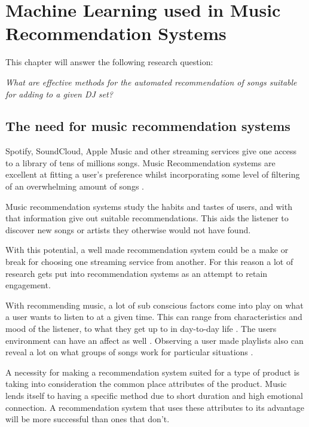 
\graphicspath{{Chapter2/}}

\chapter{Machine Learning used in Music Recommendation Systems}

This chapter will answer the following research question:

\textit{What are effective methods for the automated recommendation of songs suitable for adding to a given DJ set?} 

\section{The need for music recommendation systems}
Spotify, SoundCloud, Apple Music and other streaming services give one access to a library of tens of millions songs. Music Recommendation systems are excellent at fitting a user's preference whilst incorporating some level of filtering of an overwhelming amount of songs \citep{bollen_understanding_2010}. 

Music recommendation systems study the habits and tastes of users, and with that information give out suitable recommendations. This aids the listener to discover new songs or artists they otherwise would not have found.

With this potential, a well made recommendation system could be a make or break for choosing one streaming service from another. For this reason a lot of research gets put into recommendation systems as an attempt to retain engagement. 

 With recommending music, a lot of sub conscious factors come into play on what a user wants to listen to at a given time. This can range from characteristics and mood of the listener, to what they get up to in day-to-day life \citep{ferwerda_personality_2015, rentfrow_re_2003, gillhofer_iron_2015, wang_context-aware_2012}.  The users environment can have an affect as well \citep{kaminskas_location-aware_2013}. Observing a user made playlists also can reveal a lot on what groups of songs work for particular situations \citep{zheleva_statistical_2010, mcfee_hypergraph_2012}.
 
 A necessity for making a recommendation system suited for a type of product is taking into consideration the common place attributes of the product. Music lends itself to having a specific method due to short duration and high emotional connection. A recommendation system that uses these attributes to its advantage will be more successful than ones that don't.

